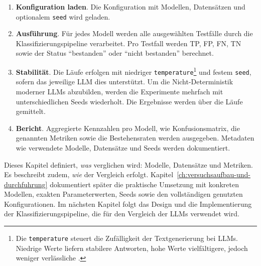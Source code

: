\begin{enumerate}
    \item \textbf{Konfiguration laden}. Die Konfiguration mit Modellen, Datensätzen und optionalem \texttt{seed} wird geladen.
    \item \textbf{Ausführung}. Für jedes Modell werden alle ausgewählten Testfälle durch die Klassifizierungspipeline verarbeitet. Pro Testfall werden \ac{TP}, \ac{FP}, \ac{FN}, \ac{TN} sowie der Status \enquote{bestanden} oder \enquote{nicht bestanden} berechnet.
    \item \textbf{Stabilität}. Die Läufe erfolgen mit niedriger \texttt{temperature}\footnote{Die \texttt{temperature} steuert die Zufälligkeit der Textgenerierung bei \acp{LLM}. Niedrige Werte liefern stabilere Antworten, hohe Werte vielfältigere, jedoch weniger verlässliche \cite{ibm-llm-temperature}.} und festem \texttt{seed}, sofern das jeweilige \ac{LLM} dies unterstützt. Um die Nicht-Deterministik moderner \acp{LLM} abzubilden, werden die Experimente mehrfach mit unterschiedlichen Seeds wiederholt. Die Ergebnisse werden über die Läufe gemittelt.
    \item \textbf{Bericht}. Aggregierte Kennzahlen pro Modell, wie Konfusionsmatrix, die genannten Metriken sowie die Bestehensraten werden ausgegeben. Metadaten wie verwendete Modelle, Datensätze und Seeds werden dokumentiert.
\end{enumerate}

Dieses Kapitel definiert, \emph{was} verglichen wird: Modelle, Datensätze und Metriken. Es beschreibt zudem, \emph{wie} der Vergleich erfolgt. Kapitel~\ref{ch:versuchsaufbau-und-durchfuhrung} dokumentiert später die praktische Umsetzung mit konkreten Modellen, exakten Parameterwerten, Seeds sowie den vollständigen genutzten Konfigurationen. Im nächsten Kapitel folgt das Design und die Implementierung der Klassifizierungspipeline, die für den Vergleich der \acp{LLM} verwendet wird.